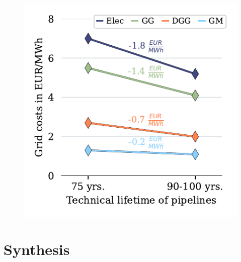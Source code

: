 \begin{figure}[h]
	\centering
	\includegraphics[width=0.6\linewidth]{figures/results/grid_charges_development/cleaned_grid_charges.pdf}
	\caption{}
	\label{fig_grid_charges_no_capex}
\end{figure}

\section{Synthesis}\label{synthesis}



